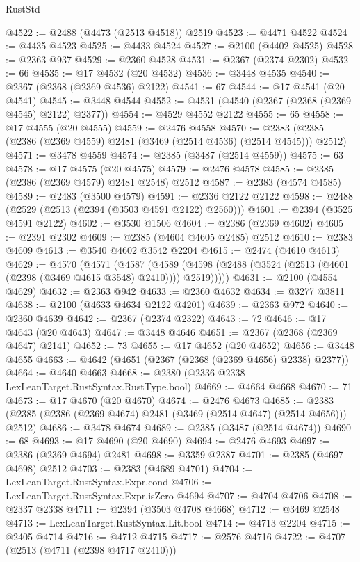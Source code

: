 \begin{lexlean}{RustStd}
\begin{coremodule}
@4522 := @2488 (@4473 (@2513 @4518)) @2519
@4523 := @4471 @4522
@4524 := @4435 @4523
@4525 := @4433 @4524
@4527 := @2100 (@4402 @4525)
@4528 := @2363 @937
@4529 := @2360 @4528
@4531 := @2367 (@2374 @2302)
@4532 := 66
@4535 := @17 @4532 (@20 @4532)
@4536 := @3448 @4535
@4540 := @2367 (@2368 (@2369 @4536) @2122)
@4541 := 67
@4544 := @17 @4541 (@20 @4541)
@4545 := @3448 @4544
@4552 := @4531 (@4540 (@2367 (@2368 (@2369 @4545) @2122) @2377))
@4554 := @4529 @4552 @2122
@4555 := 65
@4558 := @17 @4555 (@20 @4555)
@4559 := @2476 @4558
@4570 := @2383 (@2385 (@2386 (@2369 @4559) @2481 (@3469 (@2514 @4536) (@2514 @4545))) @2512)
@4571 := @3478 @4559
@4574 := @2385 (@3487 (@2514 @4559))
@4575 := 63
@4578 := @17 @4575 (@20 @4575)
@4579 := @2476 @4578
@4585 := @2385 (@2386 (@2369 @4579) @2481 @2548) @2512
@4587 := @2383 (@4574 @4585)
@4589 := @2483 (@3500 @4579)
@4591 := @2336 @2122 @2122
@4598 := @2488 (@2529 (@2513 (@2394 (@3503 @4591 @2122) @2560)))
@4601 := @2394 (@3525 @4591 @2122)
@4602 := @3530 @1506
@4604 := @2386 (@2369 @4602)
@4605 := @2391 @2302
@4609 := @2385 (@4604 @4605 @2485) @2512
@4610 := @2383 @4609
@4613 := @3540 @4602 @3542 @2204
@4615 := @2474 (@4610 @4613)
@4629 := @4570
    (@4571
      (@4587
        (@4589 (@4598 (@2488 (@3524 (@2513 (@4601 (@2398 (@3469 @4615 @3548) @2410)))) @2519)))))
@4631 := @2100 (@4554 @4629)
@4632 := @2363 @942
@4633 := @2360 @4632
@4634 := @3277 @3811
@4638 := @2100 (@4633 @4634 @2122 @4201)
@4639 := @2363 @972
@4640 := @2360 @4639
@4642 := @2367 (@2374 @2322)
@4643 := 72
@4646 := @17 @4643 (@20 @4643)
@4647 := @3448 @4646
@4651 := @2367 (@2368 (@2369 @4647) @2141)
@4652 := 73
@4655 := @17 @4652 (@20 @4652)
@4656 := @3448 @4655
@4663 := @4642 (@4651 (@2367 (@2368 (@2369 @4656) @2338) @2377))
@4664 := @4640 @4663
@4668 := @2380 (@2336 @2338 LexLeanTarget.RustSyntax.RustType.bool)
@4669 := @4664 @4668
@4670 := 71
@4673 := @17 @4670 (@20 @4670)
@4674 := @2476 @4673
@4685 := @2383 (@2385 (@2386 (@2369 @4674) @2481 (@3469 (@2514 @4647) (@2514 @4656))) @2512)
@4686 := @3478 @4674
@4689 := @2385 (@3487 (@2514 @4674))
@4690 := 68
@4693 := @17 @4690 (@20 @4690)
@4694 := @2476 @4693
@4697 := @2386 (@2369 @4694) @2481
@4698 := @3359 @2387
@4701 := @2385 (@4697 @4698) @2512
@4703 := @2383 (@4689 @4701)
@4704 := LexLeanTarget.RustSyntax.Expr.cond
@4706 := LexLeanTarget.RustSyntax.Expr.isZero @4694
@4707 := @4704 @4706
@4708 := @2337 @2338
@4711 := @2394 (@3503 @4708 @4668)
@4712 := @3469 @2548
@4713 := LexLeanTarget.RustSyntax.Lit.bool
@4714 := @4713 @2204
@4715 := @2405 @4714
@4716 := @4712 @4715
@4717 := @2576 @4716
@4722 := @4707 (@2513 (@4711 (@2398 @4717 @2410)))

\end{coremodule}
\end{lexlean}
